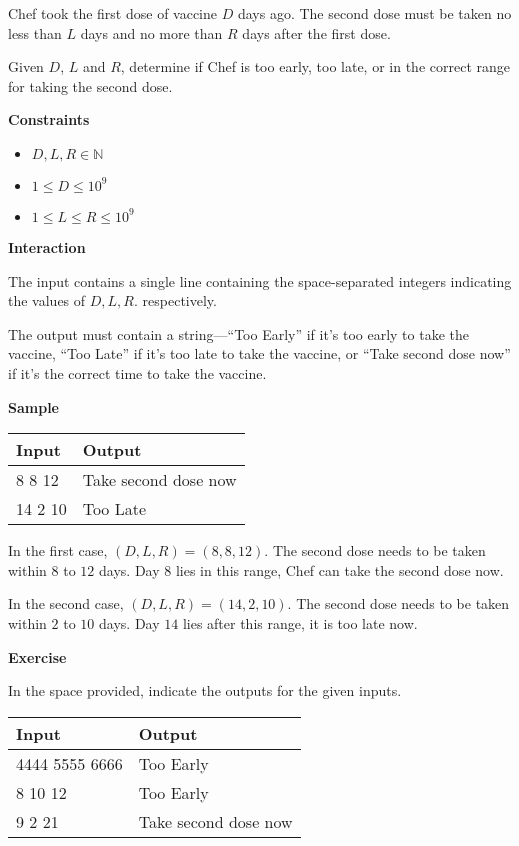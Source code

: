 \documentclass[a4paper]{exam}
\newcommand\heading[1]{\textbf{#1}}
\newcommand\inn{\in \mathbb{N}}
\begin{document}
\begin{questions}

    Chef took the first dose of vaccine $D$ days ago. The second dose must be taken no less than $L$ days and no more than $R$ days after the first dose.

    Given $D$, $L$ and $R$, determine if Chef is too early, too late, or in the correct range for taking the second dose.



    \heading{Constraints}
    \begin{itemize}
        \item $D,L,R\inn$
        \item $1 \le D \le 10^9$
        \item $1 \le L \le R \le 10^9$
    \end{itemize}


    \heading{Interaction}

    The input contains a single line containing the space-separated integers indicating the values of  $D,L,R.$ respectively.

    The output must contain a string---``Too Early'' if it's too early to take the vaccine, ``Too Late'' if it's too late to take the vaccine, or ``Take second dose now'' if it's the correct time to take the vaccine.

    \heading{Sample}

    \begin{tabularx}{\textwidth}{|X|X|}
        \rowcolor{gray!50}
        \hline
        Input   & Output               \\ \hline\hline
        8 8 12 & Take second dose now \\\hline
        14 2 10 & Too Late             \\\hline
    \end{tabularx}

    In the first case, $(D,L,R) = (8,8,12)$. The second dose needs to be taken within $8$ to $12$ days. Day $8$ lies in this range, Chef can take the second dose now.

    In the second case, $(D,L,R) = (14,2,10)$. The second dose needs to be taken within $2$ to $10$ days. Day $14$ lies after this range, it is too late now.

    \heading{Exercise}

    In the space provided, indicate the outputs for the given inputs.

    \begin{tabularx}{\textwidth}{|X|X|}
        \rowcolor{gray!50}
        \hline
        Input          & Output                                       \\ \hline\hline
        4444 5555 6666 & Too Early                              \\\hline
        8 10 12        & Too Early                              \\\hline
        9 2 21         & Take second dose now \\\hline
    \end{tabularx}


\end{questions}
\end{document}
